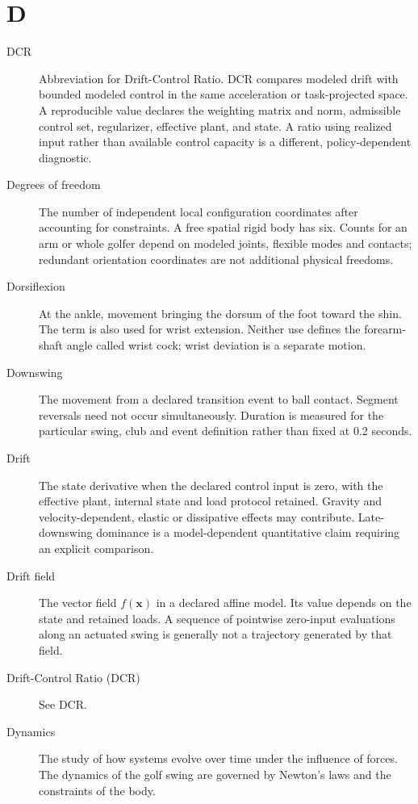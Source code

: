 \section*{D}
\begin{description}

\item[DCR] Abbreviation for Drift-Control Ratio. DCR compares modeled drift with bounded modeled control in the same acceleration or task-projected space. A reproducible value declares the weighting matrix and norm, admissible control set, regularizer, effective plant, and state. A ratio using realized input rather than available control capacity is a different, policy-dependent diagnostic.

\item[Degrees of freedom] The number of independent local configuration coordinates after accounting for constraints. A free spatial rigid body has six. Counts for an arm or whole golfer depend on modeled joints, flexible modes and contacts; redundant orientation coordinates are not additional physical freedoms.

\item[Dorsiflexion] At the ankle, movement bringing the dorsum of the foot toward the shin. The term is also used for wrist extension. Neither use defines the forearm-shaft angle called wrist cock; wrist deviation is a separate motion.

\item[Downswing] The movement from a declared transition event to ball contact. Segment reversals need not occur simultaneously. Duration is measured for the particular swing, club and event definition rather than fixed at 0.2 seconds.

\item[Drift] The state derivative when the declared control input is zero, with the effective plant, internal state and load protocol retained. Gravity and velocity-dependent, elastic or dissipative effects may contribute. Late-downswing dominance is a model-dependent quantitative claim requiring an explicit comparison.

\item[Drift field] The vector field $f(\mathbf{x})$ in a declared affine model. Its value depends on the state and retained loads. A sequence of pointwise zero-input evaluations along an actuated swing is generally not a trajectory generated by that field.

\item[Drift-Control Ratio (DCR)] See DCR.

\item[Dynamics] The study of how systems evolve over time under the influence of forces. The dynamics of the golf swing are governed by Newton's laws and the constraints of the body.

\end{description}
